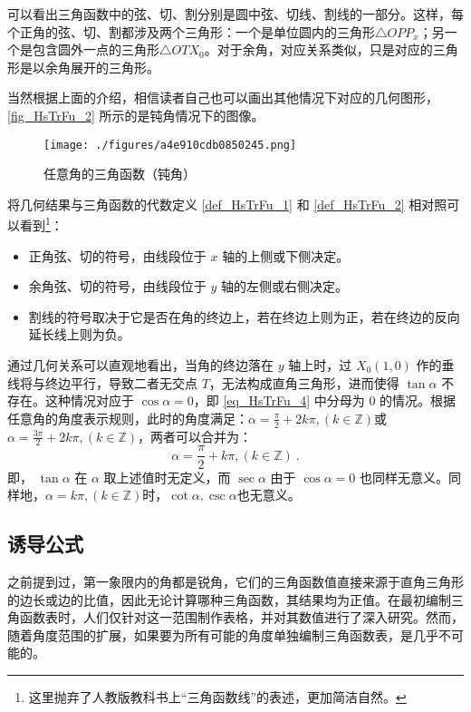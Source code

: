 可以看出三角函数中的弦、切、割分别是圆中弦、切线、割线的一部分。这样，每个正角的弦、切、割都涉及两个三角形：一个是单位圆内的三角形$\triangle OPP_x$；另一个是包含圆外一点的三角形$\triangle OTX_0$。对于余角，对应关系类似，只是对应的三角形是以余角展开的三角形。

当然根据上面的介绍，相信读者自己也可以画出其他情况下对应的几何图形，\autoref{fig_HsTrFu_2} 所示的是钝角情况下的图像。
\begin{figure}[ht]
\centering
\texttt{[image: ./figures/a4e910cdb0850245.png]}
\caption{任意角的三角函数（钝角）} \label{fig_HsTrFu_2}
\end{figure}
将几何结果与三角函数的代数定义 \autoref{def_HsTrFu_1} 和 \autoref{def_HsTrFu_2} 相对照可以看到\footnote{这里抛弃了人教版教科书上“三角函数线”的表述，更加简洁自然。}：
\begin{itemize}
\item 正角弦、切的符号，由线段位于 $x$ 轴的上侧或下侧决定。
\item 余角弦、切的符号，由线段位于 $y$ 轴的左侧或右侧决定。
\item 割线的符号取决于它是否在角的终边上，若在终边上则为正，若在终边的反向延长线上则为负。
\end{itemize}

通过几何关系可以直观地看出，当角的终边落在 $y$ 轴上时，过 $X_0(1,0)$ 作的垂线将与终边平行，导致二者无交点 $T$，无法构成直角三角形，进而使得 $\tan\alpha$ 不存在。这种情况对应于 $\cos\alpha = 0$，即 \autoref{eq_HsTrFu_4} 中分母为 $0$ 的情况。根据任意角的角度表示规则，此时的角度满足：$\displaystyle\alpha=\frac{\pi}{2}+2k\pi,(k\in\mathbb{Z})$或$\displaystyle\alpha=\frac{3\pi}{2}+2k\pi,(k\in\mathbb{Z})$，两者可以合并为：
\begin{equation}
\alpha=\frac{\pi}{2}+k\pi,(k\in\mathbb{Z})~.
\end{equation}
即， $\tan\alpha$ 在 $\alpha$ 取上述值时无定义，而 $\sec\alpha$ 由于 $\cos\alpha = 0$ 也同样无意义。同样地，$\alpha=k\pi,(k\in\mathbb{Z})$时，$\cot\alpha,\csc\alpha$也无意义。

\subsection{诱导公式}

之前提到过，第一象限内的角都是锐角，它们的三角函数值直接来源于直角三角形的边长或边的比值，因此无论计算哪种三角函数，其结果均为正值。在最初编制三角函数表时，人们仅针对这一范围制作表格，并对其数值进行了深入研究。然而，随着角度范围的扩展，如果要为所有可能的角度单独编制三角函数表，是几乎不可能的。

